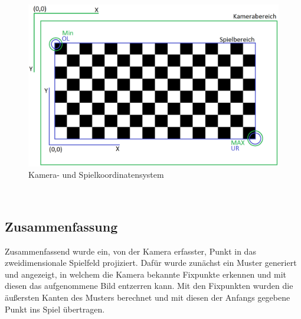 \begin{figure}[h]
	\centering
	\includegraphics[scale=0.3]{bilder/schachbrettkamera.png}
	\caption{Kamera- und Spielkoordinatensystem}
\end{figure}\\
\subsection{Zusammenfassung}
Zusammenfassend wurde ein, von der Kamera erfasster, Punkt in das zweidimensionale Spielfeld projiziert. Dafür wurde zunächst ein Muster generiert und angezeigt, in welchem die Kamera bekannte Fixpunkte erkennen und mit diesen das aufgenommene Bild entzerren kann. Mit den Fixpunkten wurden die äußersten Kanten des Musters berechnet und mit diesen der Anfangs gegebene Punkt ins Spiel übertragen.